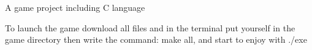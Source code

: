 A game project including C language

To launch the game download all files and in the terminal put yourself in the game directory then write the command\+: make all, and start to enjoy with ./exe 